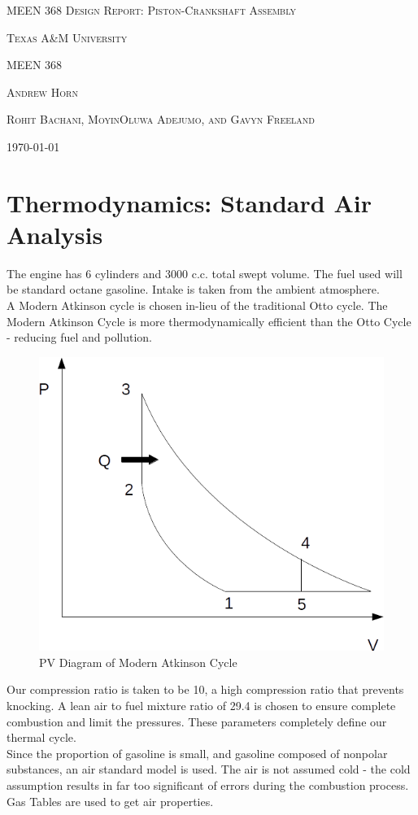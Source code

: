 \documentclass[10pt,a4paper]{article}
\begin{document}
\begin{titlepage}
		\centering
		{\scshape\Huge MEEN 368 Design Report: Piston-Crankshaft Assembly}	
		\vspace{1cm}	
		
		{\scshape\Large Texas A\&M University}
		
		{\scshape \large MEEN 368}
		
		\vspace{3 cm}
		
	{\scshape \normalsize Andrew Horn}		
		
		{\scshape \normalsize Rohit Bachani, MoyinOluwa Adejumo, and Gavyn Freeland}

		

		\vfill
		
		{\Large \today}
	\end{titlepage}
\section*{Thermodynamics: Standard Air Analysis}

The engine has 6 cylinders and 3000 c.c. total swept volume. The fuel used will be standard octane gasoline. Intake is taken from the ambient atmosphere.\\
	A Modern Atkinson cycle is chosen in-lieu of the traditional Otto cycle. The Modern Atkinson Cycle is more thermodynamically efficient than the Otto Cycle - reducing fuel and pollution.
	\begin{figure}[h]
		\centering
		\includegraphics[width=.5\textwidth]{ThermoDiagram.png}
		\caption{PV Diagram of Modern Atkinson Cycle}
		\label{fig:diagram1}
	\end{figure}
	
	Our compression ratio is taken to be 10, a high compression ratio that prevents knocking.
	A lean air to fuel mixture ratio of 29.4 is chosen to ensure complete combustion and limit the pressures. These parameters completely define our thermal cycle.\\ Since the proportion of gasoline is small, and gasoline composed of nonpolar substances, an air standard model is used. The air is not assumed cold - the cold assumption results in far too significant of errors during the combustion process. Gas Tables are used to get air properties.
\end{document}
